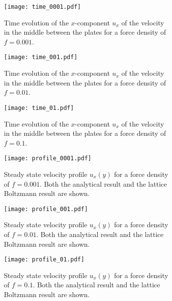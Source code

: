 \documentclass[a4paper,10pt,bibtotoc]{scrartcl}
\begin{document}
\begin{figure}[H]
\begin{subfigure}{.45\textwidth}
  \centering
  \texttt{[image: time\_0001.pdf]}  
  \caption{Time evolution of the $x$-component $u_x$ of the velocity in the middle between the plates for a force density of $f=0.001$.}
  \label{fig:time_1}
\end{subfigure}
\begin{subfigure}{.45\textwidth}
  \centering
  \texttt{[image: time\_001.pdf]}  
  \caption{Time evolution of the $x$-component $u_x$ of the velocity in the middle between the plates for a force density of $f=0.01$.}
  \label{fig:time_2}
\end{subfigure}
\begin{subfigure}{.45\textwidth}
  \centering
  \texttt{[image: time\_01.pdf]}  
  \caption{Time evolution of the $x$-component $u_x$ of the velocity in the middle between the plates for a force density of $f=0.1$.}
  \label{fig:time_3}
\end{subfigure}
\begin{subfigure}{.45\textwidth}
  \centering
  \texttt{[image: profile\_0001.pdf]}  
  \caption{Steady state velocity profile $u_x(y)$ for a force density of $f=0.001$. Both the analytical result and the lattice Boltzmann result are shown.}
  \label{fig:profile_1}
\end{subfigure}
\begin{subfigure}{.45\textwidth}
  \centering
  \texttt{[image: profile\_001.pdf]}  
  \caption{Steady state velocity profile $u_x(y)$ for a force density of $f=0.01$. Both the analytical result and the lattice Boltzmann result are shown.}
  \label{fig:profile_2}
\end{subfigure}
\hfill
\begin{subfigure}{.45\textwidth}
  \centering
  \texttt{[image: profile\_01.pdf]}  
  \caption{Steady state velocity profile $u_x(y)$ for a force density of $f=0.1$. Both the analytical result and the lattice Boltzmann result are shown.}
  \label{fig:profile_3}
\end{subfigure}
\caption{}
\label{fig:fig}
\end{figure}
\end{document}
